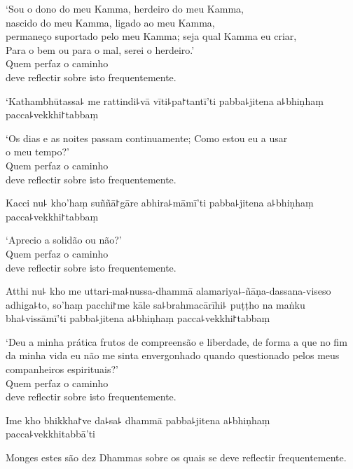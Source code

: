 \enlargethispage{2\baselineskip}

\begin{english}
  `Sou o dono do meu Kamma, herdeiro do meu Kamma,\\
  nascido do meu Kamma, ligado ao meu Kamma,\\
  permaneço suportado pelo meu Kamma; seja qual Kamma eu criar,\\
  Para o bem ou para o mal,  serei o herdeiro.'\\
  Quem perfaz o caminho\\
  deve reflectir sobre isto frequentemente.
\end{english}

\clearpage

`Kathambhūtassa꜕ me rattindi꜕vā vīti꜕pa꜓tantī'ti pabba꜕jitena a꜕bhiṇhaṃ pacca꜕vekkhi꜓tabbaṃ

\begin{english}
  `Os dias e as noites passam continuamente; Como estou eu a usar\\ o meu tempo?'\\
 Quem perfaz o caminho\\
 deve reflectir sobre isto frequentemente.
\end{english}

Kacci nu꜕ kho'haṃ suññā꜓gāre abhira꜕māmī'ti pabba꜕jitena a꜕bhiṇhaṃ pacca꜕vekkhi꜓tabbaṃ

\begin{english}
  `Aprecio a solidão ou não?'\\
  Quem perfaz o caminho\\
  deve reflectir sobre isto frequentemente.
\end{english}

Atthi nu꜕ kho me uttari-ma꜕nussa-dhammā alamariya꜕-ñāṇa-dassana-viseso adhiga꜕to, so'haṃ pacchi꜓me kāle sa꜕brahmacārīhi꜕ puṭṭho na maṅku bha꜕vissāmī'ti pabba꜕jitena a꜕bhiṇhaṃ pacca꜕vekkhi꜓tabbaṃ

\begin{english}
  `Deu a minha prática frutos de compreensão e liberdade, de forma a que no fim da minha vida eu não me sinta envergonhado quando questionado pelos meus companheiros espirituais?'\\
  Quem perfaz o caminho\\
  deve reflectir sobre isto frequentemente.
\end{english}

Ime kho bhikkha꜓ve da꜕sa꜕ dhammā pabba꜕jitena a꜕bhiṇhaṃ pacca꜕vekkhitabbā'ti

\begin{english}
  Monges estes são dez Dhammas sobre os quais se deve reflectir frequentemente.
\end{english}

